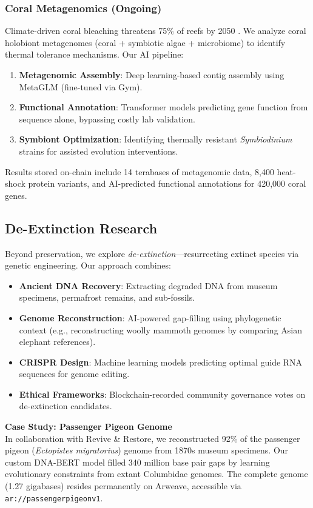\documentclass[twocolumn,11pt]{article}
\begin{document}
\subsubsection{Coral Metagenomics (Ongoing)}
Climate-driven coral bleaching threatens 75\% of reefs by 2050 \citep{hughes2018spatial}. We analyze coral holobiont metagenomes (coral + symbiotic algae + microbiome) to identify thermal tolerance mechanisms. Our AI pipeline:
\begin{enumerate}
    \item \textbf{Metagenomic Assembly}: Deep learning-based contig assembly using MetaGLM (fine-tuned via Gym).
    \item \textbf{Functional Annotation}: Transformer models predicting gene function from sequence alone, bypassing costly lab validation.
    \item \textbf{Symbiont Optimization}: Identifying thermally resistant \textit{Symbiodinium} strains for assisted evolution interventions.
\end{enumerate}

Results stored on-chain include 14 terabases of metagenomic data, 8,400 heat-shock protein variants, and AI-predicted functional annotations for 420,000 coral genes.

\subsection{De-Extinction Research}

Beyond preservation, we explore \textit{de-extinction}—resurrecting extinct species via genetic engineering. Our approach combines:

\begin{itemize}
    \item \textbf{Ancient DNA Recovery}: Extracting degraded DNA from museum specimens, permafrost remains, and sub-fossils.
    \item \textbf{Genome Reconstruction}: AI-powered gap-filling using phylogenetic context (e.g., reconstructing woolly mammoth genomes by comparing Asian elephant references).
    \item \textbf{CRISPR Design}: Machine learning models predicting optimal guide RNA sequences for genome editing.
    \item \textbf{Ethical Frameworks}: Blockchain-recorded community governance votes on de-extinction candidates.
\end{itemize}

\textbf{Case Study: Passenger Pigeon Genome} \\
In collaboration with Revive \& Restore, we reconstructed 92\% of the passenger pigeon (\textit{Ectopistes migratorius}) genome from 1870s museum specimens. Our custom DNA-BERT model filled 340 million base pair gaps by learning evolutionary constraints from extant Columbidae genomes. The complete genome (1.27 gigabases) resides permanently on Arweave, accessible via \texttt{ar://passengerpigeonv1}.
\end{document}
